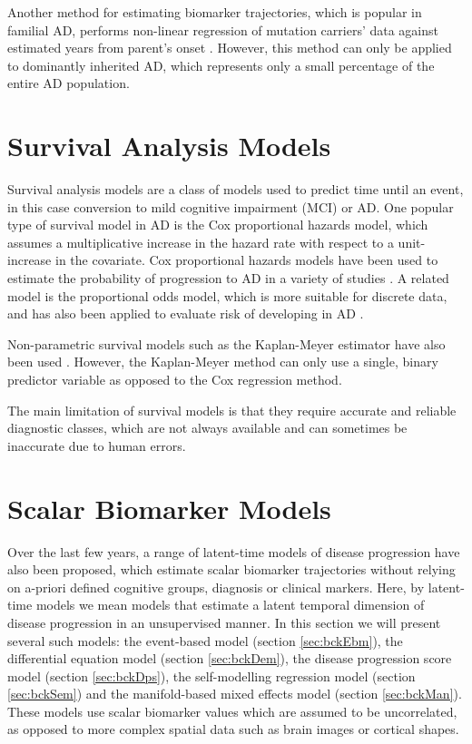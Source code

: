 Another method for estimating biomarker trajectories, which is popular in familial AD, performs non-linear regression of mutation carriers' data against estimated years from parent's onset \cite{bateman2012clinical, benzinger2013regional}. However, this method can only be applied to dominantly inherited AD, which represents only a small percentage of the entire AD population.

\section{Survival Analysis Models}
\label{sec:bckDpmSur}

Survival analysis models are a class of models used to predict time until an event, in this case conversion to mild cognitive impairment (MCI) or AD. One popular type of survival model in AD is the Cox proportional hazards model, which assumes a multiplicative increase in the hazard rate with respect to a unit-increase in the covariate. Cox proportional hazards models have been used to estimate the probability of progression to AD in a variety of studies \cite{young2014data, dickerson2011alzheimer, bouwman2007csf, csernansky2005preclinical, hansson2006association, kawas2003visual}. A related model is the proportional odds model, which is more suitable for discrete data, and has also been applied to evaluate risk of developing in AD \cite{stoub2005mri, jack200811c, vemuri2009mri}.

Non-parametric survival models such as the Kaplan-Meyer estimator have also been used \cite{morris2001mild, modrego2004depression, carr2000value, khachaturian2004apolipoprotein}. However, the Kaplan-Meyer method can only use a single, binary predictor variable as opposed to the Cox regression method.

The main limitation of survival models is that they require accurate and reliable diagnostic classes, which are not always available and can sometimes be inaccurate due to human errors.


\section{Scalar Biomarker Models}
\label{sec:bckSca}

Over the last few years, a range of latent-time models of disease progression have also been proposed, which estimate scalar biomarker trajectories without relying on a-priori defined cognitive groups, diagnosis or clinical markers. Here, by latent-time models we mean models that estimate a latent temporal dimension of disease progression in an unsupervised manner. In this section we will present several such models: the event-based model (section \ref{sec:bckEbm}), the differential equation model (section \ref{sec:bckDem}), the disease progression score model (section \ref{sec:bckDps}), the self-modelling regression model (section \ref{sec:bckSem}) and the manifold-based mixed effects model (section \ref{sec:bckMan}). These models use scalar biomarker values which are assumed to be uncorrelated, as opposed to more complex spatial data such as brain images or cortical shapes.

